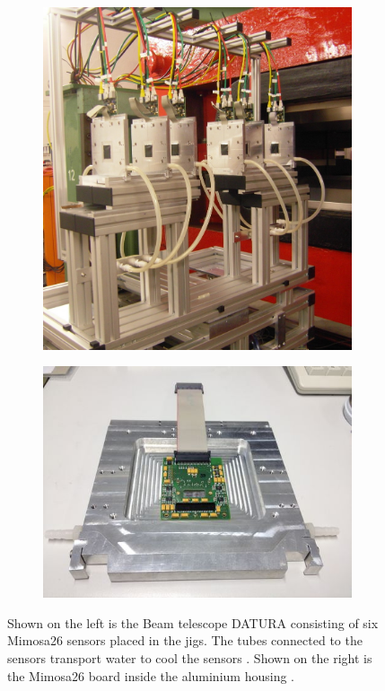 \begin{figure}
  \begin{subfigure}{0.48\textwidth}
      \centering
      \includegraphics[height=0.82\textwidth]{images/telescope.jpg}
  \end{subfigure}
  \begin{subfigure}{0.48\textwidth}
      \hspace{-1cm}
      \includegraphics[height=0.82\textwidth]{images/mimosa.jpg}
  \end{subfigure}
  \caption{Shown on the left is the Beam telescope DATURA consisting of six Mimosa26 sensors placed in the jigs. The tubes connected to the sensors transport water to
  cool the sensors \cite{telescope}. Shown on the right is the Mimosa26 board inside the aluminium housing \cite{mimosa}. }
  \label{fig:telescope}
\end{figure}

